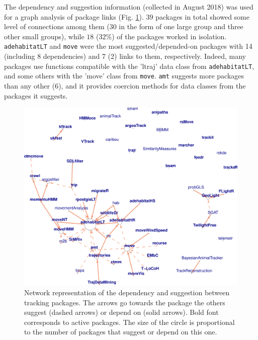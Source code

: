 \documentclass[a4paper,12pt]{article}
\newcommand{\Rpkg}[1]{\texttt{#1}}
\begin{document}
The dependency and suggestion information (collected in August 2018) was used for a graph analysis of package links (Fig. \ref{fig:NetImpSuggMov}). $39$ packages in total showed some level of connections among them ($30$ in the form of one large group and three other small groups), while $18$ ($32\%$) of the packages worked in isolation. \Rpkg{adehabitatLT} and \Rpkg{move} were the most suggested/depended-on packages with 14 (including 8 dependencies) and 7 (2) links to them, respectively. Indeed, many packages use functions compatible with the 'ltraj' data class from \Rpkg{adehabitatLT}, and some others with the 'move' class from \Rpkg{move}. \Rpkg{amt} suggests more packages than any other (6), and it provides coercion methods for data classes from the packages it suggests. 

\begin{figure}
        \centering
        \includegraphics[width=1\textwidth]{./mes_images/NetworkImportSuggestTrack2.pdf}
        \caption{\label{fig:NetImpSuggMov} Network representation of the dependency and suggestion between tracking packages. The arrows go towards the package the others suggest (dashed arrows) or depend on (solid arrows). Bold font corresponds to active packages. The size of the circle is proportional to the number of packages that suggest or depend on this one.} %
\end{figure}
\end{document}
